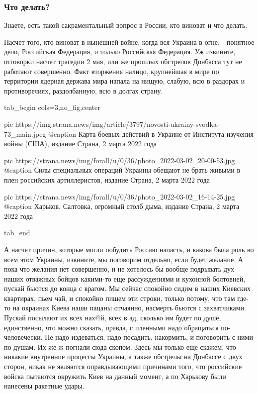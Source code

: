  
 
 
 
 
\subsubsection{Что делать?}
\label{sec:moje.prizyv.chto_delat}

Знаете, есть такой сакраментальный вопрос в России, кто виноват и что делать.

Насчет того, кто виноват в нынешней войне, когда вся Украина в огне, - понятное
дело, Российская Федерация, и только Российская Федерация. Уж извините,
отговорки насчет трагедии 2 мая, или же прошлых обстрелов Донбасса тут не
работают совершенно. Факт вторжения налицо, крупнейшая в мире по территории
ядерная держава мира напала на нищую, слабую, всю в раздорах и противоречиях,
раздолбанную, всю в долгах страну. 

\ifcmt
  tab_begin cols=3,no_fig,center

     pic https://img.strana.news/img/article/3797/novosti-ukrainy-svodka-73_main.jpeg
		 @caption Карта боевых действий в Украине от Института изучения войны (США), издание Страна, 2 марта 2022 года

		 pic https://strana.news/img/forall/u/0/36/photo_2022-03-02_20-00-53.jpg
		 @caption Силы специальных операций Украины обещают не брать живыми в плен российских артиллеристов, издание Страна, 2 марта 2022 года

		 pic https://strana.news/img/forall/u/0/36/photo_2022-03-02_16-14-25.jpg
		 @caption Харьков. Салтовка, огромный столб дыма, издание Страна, 2 марта 2022 года

  tab_end
\fi

А насчет причин, которые могли побудить Россию напасть, и какова была роль во
всем этом Украины, извините, мы поговорим отдельно, если будет желание. А пока
что желания нет совершенно, и не хотелось бы вообще подрывать дух наших
отважных бойцов какими-то еще рассуждениями и кухонной болтовней, пускай бьются
до конца с врагом.  Мы сейчас спокойно сидим в наших Киевских квартирах, пьем
чай, и спокойно пишем эти строки, только потому, что там где-то на окраинах
Киева наши пацаны отчаянно, насмерть бьются с захватчиками. Пускай посылают их
всех нах@й, всех в ад, сколько им будет по душе, единственно, что можно
сказать, правда, с пленными надо обращаться по-человечески. Не надо издеваться,
надо посадить, накормить, и поговорить с ними по душам. Их же ж погнали сюда
скопом. Здесь мы только еще скажем, что никакие внутренние процессы Украины, а
также обстрелы на Донбассе с двух сторон, никак не являются оправдывающими
причинами того, что российские войска пытаются окружить Киев на данный момент,
а по Харькову были нанесены ракетные удары. 


